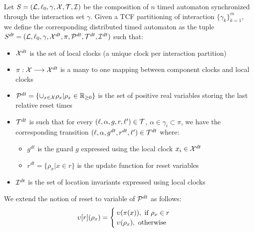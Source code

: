 \begin{definition}
  Let $S=(\mathcal{L},\ell_0,\gamma,\mathcal{X},\mathcal{T},\mathcal{I})$ be the composition of $n$ timed automaton synchronized through the interaction
set $\gamma$. Given a TCF partitioning of interaction $\{\gamma_k\}_{k=1}^m$,
we define the corresponding distributed timed automaton
as the tuple $S^{dt}=(\mathcal{L},\ell_0,\gamma,\mathcal{X}^{dt},\pi,\mathcal{P}^{dt},\mathcal{T}^{dt},\mathcal{I}^{dt})$ such that:
\begin{itemize}
  \item $\mathcal{X}^{dt}$ is the set of local clocks (a unique clock per interaction partition) 
  \item $\pi:\mathcal{X}\longrightarrow\mathcal{X}^{dt}$ is a many to one mapping between component clocks and local clocks 
  \item $\mathcal{P}^{dt}=\{\cup_{x\in\mathcal{X}}\rho_x|\rho_x\in\mathbb{R}_{\ge 0}\}$ is the set of positive real variables
    storing the last relative reset times
  \item $\mathcal{T}^{dt}$ is such that for every $(\ell,\alpha,g,r,\ell')\in\mathcal{T}$, $\alpha\in\gamma_i\subset\pi$, we have
    the corresponding transition $(\ell,\alpha,g^{dt},r^{dt},\ell')\in\mathcal{T}^{dt}$ where:
  \begin{itemize}
    \item $g^{dt}$ is the guard $g$ expressed using the local clock $x_i\in\mathcal{X}^{dt}$ 
    \item $r^{dt}=\{\rho_x|x\in r\}$ is the update function for reset variables 
  \end{itemize}
  \item $\mathcal{I}^{dt}$ is the set of location invariants expressed using local clocks 
\end{itemize}
\end{definition}

We extend the notion of reset to variable of $\mathcal{P}^{dt}$ as follows:
\[\upsilon[r](\rho_x)=\begin{cases}
  \upsilon(\pi(x)), \text{ if }\rho_x\in r \\
  \upsilon(\rho_x), \text{ otherwise}
\end{cases}\]


